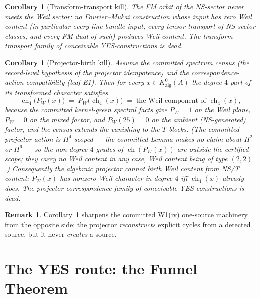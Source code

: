 \documentclass[11pt]{article}
\newtheorem{corollary}[theorem]{Corollary}
\theoremstyle{definition}
\newtheorem{remark}[theorem]{Remark}
\newcommand{\ch}{\operatorname{ch}}
\begin{document}
\begin{corollary}[Transform-transport kill]\label{cor:w71}
The FM orbit of the NS-sector never meets the Weil sector: no Fourier--Mukai
construction whose input has zero Weil content (in particular every
line-bundle input, every tensor transport of NS-sector classes, and every
FM-dual of such) produces Weil content. The transform-transport family of
conceivable YES-constructions is dead.
\end{corollary}

\begin{corollary}[Projector-birth kill]\label{cor:w72}
Assume the committed spectrum census (the record-level hypothesis of the
projector idempotence) and the correspondence-action compatibility (leaf E1).
Then for every $x\in K^0_{\mathrm{alg}}(A)$ the degree-$4$ part of its
transformed character satisfies
\[
\ch_4\bigl(P_W(x)\bigr)\;=\;P_W\bigl(\ch_4(x)\bigr)\;=\;\text{the Weil
component of }\ch_4(x),
\]
because the committed kernel-green spectral facts give $P_W=1$ on the Weil
plane, $P_W=0$ on the mixed factor, and $P_W(25)=0$ on the ambient
(NS-generated) factor, and the census extends the vanishing to the
$T$-blocks. (The committed projector action is $H^4$-scoped --- the
committed Lemma makes no claim about $H^2$ or $H^6$ --- so the non-degree-$4$
grades of $\ch(P_W(x))$ are outside the certified scope; they carry no
Weil content in any case, Weil content being of type $(2,2)$.)
Consequently the algebraic projector cannot \emph{birth} Weil content from
NS/T content: $P_W(x)$ has nonzero Weil character in degree $4$ iff $\ch_4(x)$
already does.
The projector-correspondence family of conceivable YES-constructions is dead.
\end{corollary}

\begin{remark}
Corollary~\ref{cor:w72} sharpens the committed W1(iv) one-source machinery from
the opposite side: the projector \emph{reconstructs} explicit cycles from a
detected source, but it never \emph{creates} a source.
\end{remark}

\section{The YES route: the Funnel Theorem}\label{sec:funnel}
\end{document}
